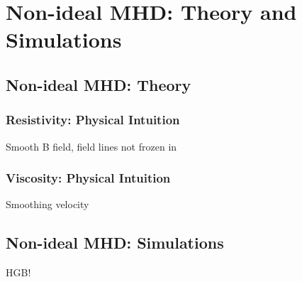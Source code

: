 \chapter{Non-ideal MHD: Theory and Simulations}

\section{Non-ideal MHD: Theory}

\subsection{Resistivity: Physical Intuition}
Smooth B field, field lines not frozen in

\subsection{Viscosity: Physical Intuition}
Smoothing velocity
\section{Non-ideal MHD: Simulations}
HGB!



